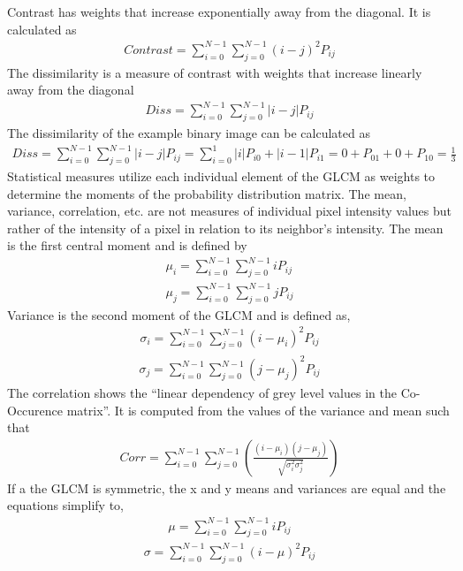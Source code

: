 Contrast has weights that increase exponentially away from the diagonal.  It is calculated as
%
\begin{align}
    Contrast = \sum_{i=0}^{N-1}\sum_{j=0}^{N-1}(i-j)^2P_{ij}
\end{align}
%
The dissimilarity is a measure of contrast with weights that increase linearly away from the diagonal
%
\begin{align}
    Diss = \sum_{i=0}^{N-1}\sum_{j=0}^{N-1}|i-j|P_{ij}
\end{align}
%
The dissimilarity of the example binary image can be calculated as
%
\begin{align}
    Diss = \sum_{i=0}^{N-1}\sum_{j=0}^{N-1}|i-j|P_{ij}
    = \sum_{i=0}^{1}|i|P_{i0}+|i-1|P_{i1}
    = 0 + P_{01} + 0 + P_{10} = \frac{1}{3}
\end{align}
%
Statistical measures utilize each individual element of the GLCM as weights to determine the moments of the probability distribution matrix. The mean, variance, correlation, etc. are not measures of individual pixel intensity values but rather of the intensity of a pixel in relation to its neighbor’s intensity. The mean is the first central moment and is defined by
%
\begin{align}
    \mu_i = \sum_{i=0}^{N-1}\sum_{j=0}^{N-1}iP_{ij} \\
    \mu_j = \sum_{i=0}^{N-1}\sum_{j=0}^{N-1}jP_{ij}
\end{align}
%
Variance is the second moment of the GLCM and is defined as,
%
\begin{align}
    \sigma_i = \sum_{i=0}^{N-1}\sum_{j=0}^{N-1}(i-\mu_i)^2P_{ij}
\end{align}
\begin{align}
    \sigma_j = \sum_{i=0}^{N-1}\sum_{j=0}^{N-1}(j-\mu_j)^2P_{ij}
\end{align}
%
The correlation shows the “linear dependency of grey level values in the Co-Occurence matrix”\cite{haralickcancer}.  It is computed from the values of the variance and mean such that
%
\begin{align}
    Corr = \sum_{i=0}^{N-1}\sum_{j=0}^{N-1}(\frac{(i-\mu_i)(j-\mu_j)}{\sqrt{\sigma_i^2 \sigma_j^2}})
\end{align}
%
If a the GLCM is symmetric, the x and y means and variances are equal and the equations simplify to,
%
\begin{align}
    \mu = \sum_{i=0}^{N-1}\sum_{j=0}^{N-1}iP_{ij}
\end{align}
\begin{align}
    \sigma = \sum_{i=0}^{N-1}\sum_{j=0}^{N-1}(i-\mu)^2P_{ij}
\end{align}

